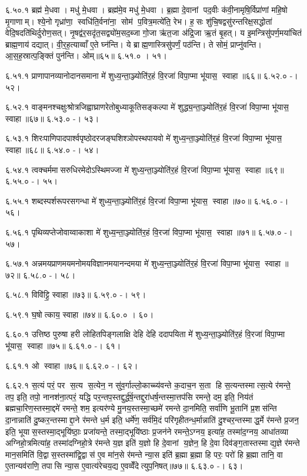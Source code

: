 ६.५०.१
ब्रह्म॑ मे॒धवा। मधु॑ मे॒धवा। ब्रह्म॑मे॒व मधु॑ मे॒धवा। ब्र॒ह्मा दे॒वानां पद॒वीः क॑वी॒नामृषि॒र्विप्रा॑णां महि॒षो मृ॒गाणाम्। श्ये॒नो गृध्रा॑णा॒ स्वधि॑ति॒र्वना॑ना॒ सोम॑ प॒वित्र॒मत्ये॑ति॒ रेभ\sn{}। ह॒सः  शु॑चि॒षद्वसु॑रन्तरिक्ष॒सद्धोता॑ वेदि॒षदति॑थिर्दुरोण॒सत्। नृ॒षद्व॑र॒सदृ॑त॒सद्व्यो॑म॒सद॒ब्जा गो॒जा ऋ॑त॒जा अ॑द्रि॒जा ऋ॒तं बृ॒हत्। य इ॒मन्त्रिसु॑पर्ण॒मया॑चितं ब्राह्म॒णाय॑ दद्यात्। वी॒र॒ह॒त्याव्वाँ ए॒ते घ्न॑न्ति। ये ब्राह्म॒णास्त्रिसु॑पर्णं॒ पठ॑न्ति। ते सोमं॒ प्राप्नु॑वन्ति। आ॒स॒ह॒स्रात्प॒ङ्क्तिं पुन॑न्ति। ओम्॥६५॥
६.५१.०
। ५१।
\anuvakamend

६.५१.१
प्राणापानव्यानोदानसमाना मे॑ शुध्य॒न्ता॒ञ्ज्योति॑र॒हं  वि॒रजा॑ विपा॒प्मा भू॑यास॒ स्वाहा॥६६॥
६.५२.०
-। ५२।
\anuvakamend

६.५२.१
वाङ्मनश्चक्षुःश्रोत्रजिह्वाघ्राणरेतोबुध्याकूतिसङ्कल्पा मे॑ शुद्ध्य॒न्ता॒ञ्ज्योति॑र॒हं  वि॒रजा॑ विपा॒प्मा भू॑यास॒ स्वाहा॥६७॥
६.५३.०
-। ५३।
\anuvakamend

६.५३.१
शिरःपाणिपादपार्श्वपृष्ठोदरजङ्घशिश्ञोपस्थपायवो मे॑ शुध्य॒न्ता॒ञ्ज्योति॑र॒हं  वि॒रजा॑ विपा॒प्मा भू॑यास॒ स्वाहा॥६८॥
६.५४.०
-। ५४।
\anuvakamend

६.५४.१
त्वक्चर्ममासरुधिरमेदोऽस्थिमज्जा मे॑ शुध्य॒न्ता॒ञ्ज्योति॑र॒हं  वि॒रजा॑ विपा॒प्मा भू॑यास॒ स्वाहा॥६९॥
६.५५.०
-। ५५।
\anuvakamend

६.५५.१
शब्दस्पर्शरूपरसगन्धा मे॑ शुध्य॒न्ता॒ञ्ज्योति॑र॒हं  वि॒रजा॑ विपा॒प्मा भू॑यास॒ स्वाहा॥७०॥
६.५६.०
-। ५६।
\anuvakamend

६.५६.१
पृथिव्यप्तेजोवाय्वाकाशा मे॑ शुध्य॒न्ता॒ञ्ज्योति॑र॒हं  वि॒रजा॑ विपा॒प्मा भू॑यास॒ स्वाहा॥७१॥
६.५७.०
-। ५७।
\anuvakamend

६.५७.१
अन्नमयप्राणमयमनोमयविज्ञानमयानन्दमया मे॑ शुध्य॒न्ता॒ञ्ज्योति॑र॒हं  वि॒रजा॑ विपा॒प्मा भू॑यास॒ स्वाहा॥७२॥
६.५८.०
-। ५८।
\anuvakamend

६.५८.१
विवि॑ट्टि॒ स्वाहा॥७३॥
६.५९.०
-। ५९।
\anuvakamend

६.५९.१
घ॒षोत्काय॒ स्वाहा॥७४॥
६.६०.०
। ६०।
\anuvakamend

६.६०.१
उत्तिष्ठ पुरुषा हरी लोहितपिङ्गलाक्षि देहि देहि ददापयिता मे॑ शुध्य॒न्ता॒ञ्ज्योति॑र॒हं  वि॒रजा॑ विपा॒प्मा भू॑यास॒ स्वाहा॥७५॥
६.६१.०
-। ६१।
\anuvakamend

६.६१.१
ओ स्वाहा॥७६॥
६.६२.०
-। ६२।
\anuvakamend

६.६२.१
स॒त्यं परं॒ पर स॒त्य स॒त्येन॒ न सु॑व॒र्गाल्लो॒काच्च्य॑वन्ते क॒दाच॒न स॒ता हि स॒त्यन्तस्मात्स॒त्ये र॑मन्ते॒ तप॒ इति॒ तपो॒ नानश॑ना॒त्परं॒ यद्धि पर॒न्तप॒स्तद्दुर्द्ध॑र्\mbox{}ष॒न्तद्दुरा॑धर्\mbox{}ष॒न्तस्मा॒त्तप॑सि रमन्ते॒ दम॒ इति॒ निय॑तं ब्रह्मचा॒रिण॒स्तस्मा॒द्दमे॑ रमन्ते॒ शम॒ इत्यर॑ण्ये मु॒नय॒स्तस्मा॒च्छमे॑ रमन्ते दा॒नमिति॒ सर्वा॑णि भू॒तानि॑ प्र॒शस॑न्ति दा॒नान्नाति॑ दु॒ष्कर॒न्तस्माद्दा॒ने र॑मन्ते ध॒र्म इति॒ धर्मे॑ण॒ सर्व॑मि॒दं परि॑गृहीतन्ध॒र्मान्नाति॑ दु॒श्चर॒न्तस्माद्ध॒र्मे र॑मन्ते प्र॒जन॒ इति॒ भूयास॒स्तस्मा॒द्भूयि॑ष्ठाः॒ प्रजा॑यन्ते॒ तस्मा॒द्भूयि॑ष्ठाः प्र॒जन॑ने रमन्ते॒ऽग्नय॒ इत्या॑ह॒ तस्मा॑द॒ग्नय॒ आधा॑तव्या अग्निहो॒त्रमित्या॑ह॒ तस्मा॑दग्निहो॒त्रे र॑मन्ते य॒ज्ञ इति॑ य॒ज्ञो हि दे॒वानां य॒ज्ञेन॒ हि दे॒वा दिव॑ङ्ग॒तास्तस्माद्य॒ज्ञे र॑मन्ते मान॒समिति॑ वि॒द्वास॒स्तस्मा॑द्वि॒द्वास॑ ए॒व मा॑न॒से र॑मन्ते न्या॒स इति॑ ब्र॒ह्मा ब्र॒ह्मा हि परः॒ परो॑ हि ब्र॒ह्मा तानि॒ वा ए॒तान्यव॑राणि॒ तपासि न्या॒स ए॒वात्य॑रेचय॒द्य ए॒वव्वेँदेत्युप॒निषत्॥७७॥
६.६३.०
-। ६३।
\anuvakamend

